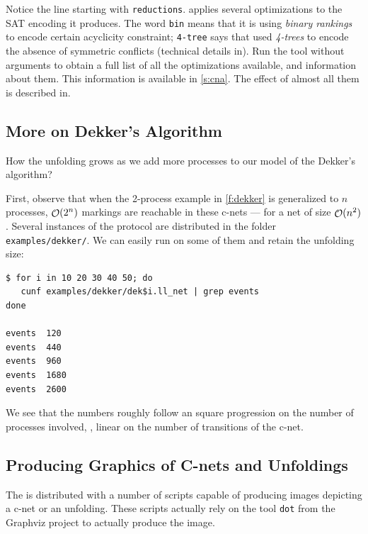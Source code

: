 \documentclass[a4paper]{refart}
\begin{document}
Notice the line starting with \verb!reductions!.
\cna applies several optimizations to the SAT encoding it produces.
The word \verb!bin! means that it is using \emph{binary rankings} to
encode certain acyclicity constraint;
\verb!4-tree! says that \cna used
\textit{4-trees} to encode the absence of symmetric conflicts
(technical details in\cite{RS12,RS12rr}).
Run the tool without arguments to obtain a full list of all the
optimizations available, and information about them.
This information is available in \cref{s:cna}.
The effect of almost all them is described in\cite{RS12rr}.

\subsection{More on Dekker's Algorithm}%
\label{s:dekker}

How the unfolding grows as we add more processes to our model of the
Dekker's algorithm?

First, observe that when the 2-process example in \cref{f:dekker} is
generalized to $n$ processes, $\mathop{\mathcal{O}} (2^n)$ markings are
reachable in these c-nets --- for a net of size $\mathop{\mathcal{O}} (n^2)$.
Several instances of the protocol are distributed in the folder
\verb!examples/dekker/!.  We can easily run \cunf on some of them and retain
the unfolding size:
\begin{verbatim}
$ for i in 10 20 30 40 50; do
   cunf examples/dekker/dek$i.ll_net | grep events
done

events  120
events  440
events  960
events  1680
events  2600
\end{verbatim}
We see that the numbers roughly follow an square progression on the number of
processes involved, \ie, linear on the number of transitions of the c-net.


\subsection{Producing Graphics of C-nets and Unfoldings}%
\label{s:seeing}

The \cunft{} is distributed with a number of scripts capable
of producing images depicting a c-net or an unfolding.
These scripts actually rely on the tool \verb!dot! from the Graphviz
project\cite{Graphviz} to actually produce the image.
\end{document}
